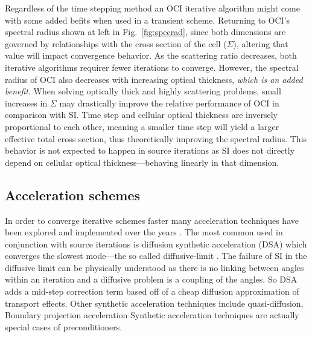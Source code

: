 Regardless of the time stepping method an OCI iterative algorithm might come with some added befits when used in a transient scheme.
Returning to OCI's spectral radius shown at left in Fig.~\ref{fig:specrad}, since both dimensions are governed by relationships with the cross section of the cell ($\Sigma$), altering that value will impact convergence behavior. 
As the scattering ratio decreases, both iterative algorithms requirer fewer iterations to converge.
However, the spectral radius of OCI also decreases with increasing optical thickness, \textit{which is an added benefit}.
When solving optically thick and highly scattering problems, small increases in $\Sigma$ may drastically improve the relative performance of OCI in comparison with SI.
Time step and cellular optical thickness are inversely proportional to each other, meaning a smaller time step will yield a larger effective total cross section, thus theoretically improving the spectral radius.
This behavior is not expected to happen in source iterations as SI does not directly depend on cellular optical thickness---behaving linearly in that dimension.


\subsection{Acceleration schemes}
In order to converge iterative schemes faster many acceleration techniques have been explored and implemented over the years \cite{adams_fast_2002}.
The most common used in conjunction with source iterations is diffusion synthetic acceleration (DSA) which converges the slowest mode---the so called diffusive-limit \cite{adams_fast_2002}.
The failure of SI in the diffusive limit can be physically understood as there is no linking between angles within an iteration and a diffusive problem is a coupling of the angles.
So DSA adds a mid-step correction term based off of a cheap diffusion approximation of transport effects.
Other synthetic acceleration techniques include quasi-diffusion, Boundary projection acceleration
Synthetic acceleration techniques are actually special cases of preconditioners.

